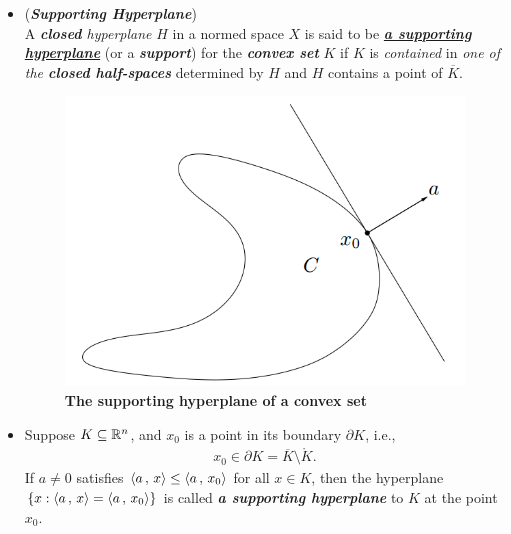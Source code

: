 \documentclass[11pt]{article}
\begin{document}
\begin{itemize}
\item \begin{definition} (\emph{\textbf{Supporting Hyperplane}})\\
A \emph{\textbf{closed} hyperplane} $H$ in a normed space $X$ is said to be \underline{\emph{\textbf{a supporting hyperplane}}} (or a  \emph{\textbf{support}}) for the \emph{\textbf{convex set}} $K$ if $K$ is \emph{contained} in \emph{one of the \textbf{closed half-spaces}} determined by $H$ and $H$ contains a point of $\overline{K}$.
\end{definition}

\begin{figure}
\begin{minipage}[t]{1\linewidth}
  \centering
  \centerline{\includegraphics[scale = 0.4]{supporting_hyperplane.png}}
\end{minipage}
\caption{\footnotesize{\textbf{The supporting hyperplane of a convex set \citep{boyd2004convex}}}}
\label{fig: supporting_hyperplane}
\end{figure}

\item \begin{remark}
Suppose $K \subseteq {\mathbb R}^n$, and $x_0$ is a point in its boundary $\partial K$, i.e.,
\begin{align*}
x_0 \in \partial K = \overline{K} \setminus \mathring{K}.
\end{align*}
If $a \neq 0$ satisfies $\left\langle a\,,\, x \right\rangle \le  \left\langle a\,,\, x_0 \right\rangle$ for all $x \in K$, then the hyperplane $\{x: \left\langle a\,,\, x \right\rangle = \left\langle a\,,\, x_0 \right\rangle\}$
is called \emph{\textbf{a supporting hyperplane}} to $K$ at the point $x_0$.
\end{remark}


\end{itemize}
\end{document}
